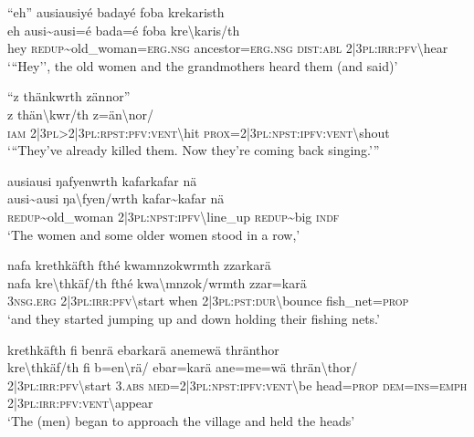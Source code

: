 \ea\label{ex:5:a1599}
``eh'' ausiausiyé badayé foba krekaristh\\
\gll eh	ausi{\textasciitilde}ausi=é	bada=é	foba	kre{\textbackslash}karis/th\\
     hey	\textsc{redup}{\textasciitilde}old\_woman=\textsc{erg}.\textsc{nsg}	ancestor=\textsc{erg}.\textsc{nsg}	\textsc{dist}:\textsc{abl}	2|3\textsc{pl}:\textsc{irr}:\textsc{pfv}{\textbackslash}hear\\
\glt `{``}Hey'', the old women and the grandmothers heard them (and said)'
\z

\ea\label{ex:5:a1601}
``z thänkwrth zännor''\\
\gll z	thän{\textbackslash}kwr/th	z=än{\textbackslash}nor/\\
     \textsc{iam}	2|3\textsc{pl}>2|3\textsc{pl}:\textsc{rpst}:\textsc{pfv}:\textsc{vent}{\textbackslash}hit	\textsc{prox}=2|3\textsc{pl}:\textsc{npst}:\textsc{ipfv}:\textsc{vent}{\textbackslash}shout\\
\glt `{``}They've already killed them. Now they're coming back singing.'''
\z

\ea\label{ex:5:a1602}
ausiausi ŋafyenwrth kafarkafar nä\\
\gll ausi{\textasciitilde}ausi	ŋa{\textbackslash}fyen/wrth	kafar{\textasciitilde}kafar	nä\\
     \textsc{redup}{\textasciitilde}old\_woman	2|3\textsc{pl}:\textsc{npst}:\textsc{ipfv}{\textbackslash}line\_up	\textsc{redup}{\textasciitilde}big	\textsc{indf}\\
\glt `The women and some older women stood in a row,'
\z

\ea\label{ex:5:a1604}
nafa krethkäfth fthé kwamnzokwrmth zzarkarä\\
\gll nafa	kre{\textbackslash}thkäf/th	fthé	kwa{\textbackslash}mnzok/wrmth	zzar=karä\\
     3\textsc{nsg}.\textsc{erg}	2|3\textsc{pl}:\textsc{irr}:\textsc{pfv}{\textbackslash}start	when	2|3\textsc{pl}:\textsc{pst}:\textsc{dur}{\textbackslash}bounce	fish\_net=\textsc{prop}\\
\glt `and they started jumping up and down holding their fishing nets.'
\z

\ea\label{ex:5:a1605}
krethkäfth fi benrä ebarkarä anemewä thränthor\\
\gll kre{\textbackslash}thkäf/th	fi	b=en{\textbackslash}rä/	ebar=karä	ane=me=wä	thrän{\textbackslash}thor/\\
     2|3\textsc{pl}:\textsc{irr}:\textsc{pfv}{\textbackslash}start	3.\textsc{abs}	\textsc{med}=2|3\textsc{pl}:\textsc{npst}:\textsc{ipfv}:\textsc{vent}{\textbackslash}be	head=\textsc{prop}	\textsc{dem}=\textsc{ins}=\textsc{emph}	2|3\textsc{pl}:\textsc{irr}:\textsc{pfv}:\textsc{vent}{\textbackslash}appear\\
\glt `The (men) began to approach the village and held the heads'
\z

